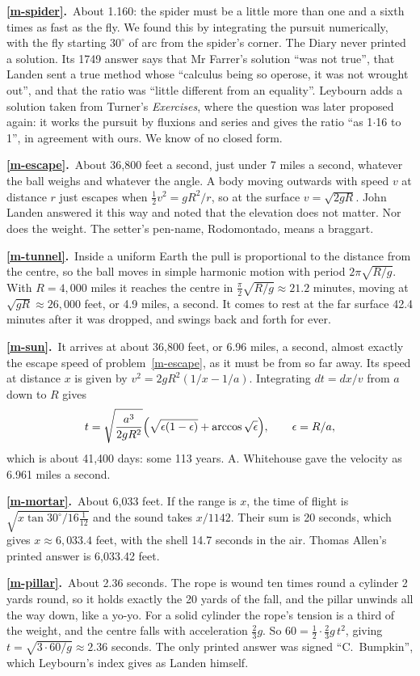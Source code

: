 \documentclass[11pt,a4paper]{article}
\newcounter{prob}
\newcommand{\ans}[2]{\par\smallskip\noindent\textbf{\ref{#1}.}\ #2}
\begin{document}
\ans{m-spider}{About 1.160: the spider must be a little more than one and a sixth times as
fast as the fly. We found this by integrating the pursuit numerically, with the fly
starting $30^\circ$ of arc from the spider's corner. The Diary never printed a solution.
Its 1749 answer says that Mr Farrer's solution ``was not true'', that Landen sent a true
method whose ``calculus being so operose, it was not wrought out'', and that the ratio was
``little different from an equality''. Leybourn adds a solution taken from Turner's
\textit{Exercises}, where the question was later proposed again: it works the pursuit by
fluxions and series and gives the ratio ``as 1$\cdot$16 to 1'', in agreement with ours. We
know of no closed form.}

\ans{m-escape}{About 36,800 feet a second, just under 7 miles a second, whatever the
ball weighs and whatever the angle. A body moving outwards with speed $v$ at distance $r$
just escapes when $\tfrac12v^2 = gR^2/r$, so at the surface $v = \sqrt{2gR}$. John Landen
answered it this way and noted that the elevation does not matter. Nor does the weight. The setter's pen-name, Rodomontado, means a braggart.}

\ans{m-tunnel}{Inside a uniform Earth the pull is proportional to the distance from the
centre, so the ball moves in simple harmonic motion with period $2\pi\sqrt{R/g}$. With
$R = 4{,}000$ miles it reaches the centre in $\tfrac\pi2\sqrt{R/g}\approx21.2$ minutes,
moving at $\sqrt{gR}\approx26{,}000$ feet, or 4.9 miles, a second. It comes to rest at
the far surface 42.4 minutes after it was dropped, and swings back and forth for ever.}

\ans{m-sun}{It arrives at about 36,800 feet, or 6.96 miles, a second, almost exactly the
escape speed of problem~\ref{m-escape}, as it must be from so far away. Its speed at distance $x$ is
given by $v^2 = 2gR^2(1/x - 1/a)$. Integrating $dt = dx/v$ from $a$ down to $R$ gives
\[ t = \sqrt{\frac{a^3}{2gR^2}}\Bigl(\sqrt{\epsilon(1-\epsilon)} + \arccos\sqrt\epsilon\Bigr),
\qquad \epsilon = R/a, \]
which is about 41,400 days: some 113 years. A. Whitehouse gave the velocity as 6.961
miles a second.}

\ans{m-mortar}{About 6,033 feet. If the range is $x$, the time of flight is
$\sqrt{x\tan30^\circ/16\tfrac1{12}}$ and the sound takes $x/1142$. Their sum is 20
seconds, which gives $x\approx6{,}033.4$ feet, with the shell 14.7 seconds in the air.
Thomas Allen's printed answer is 6,033.42 feet.}

\ans{m-pillar}{About 2.36 seconds. The rope is wound ten times round a cylinder 2 yards
round, so it holds exactly the 20 yards of the fall, and the pillar unwinds all the way
down, like a yo-yo. For a solid cylinder the rope's tension is a third of the weight, and
the centre falls with acceleration $\tfrac23g$. So $60 = \tfrac12\cdot\tfrac23g\,t^2$,
giving $t = \sqrt{3\cdot60/g}\approx2.36$ seconds. The only printed answer was signed
``C.~Bumpkin'', which Leybourn's index gives as Landen himself.}
\end{document}
